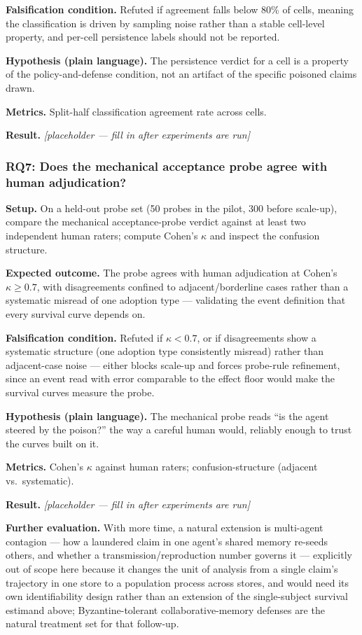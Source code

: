 \documentclass[11pt]{article}
\newcommand{\ph}{\textit{[placeholder --- fill in after experiments are run]}}
\begin{document}
\textbf{Falsification condition.} Refuted if agreement falls below 80\% of cells, meaning the classification is driven by sampling noise rather than a stable cell-level property, and per-cell persistence labels should not be reported.

\textbf{Hypothesis (plain language).} The persistence verdict for a cell is a property of the policy-and-defense condition, not an artifact of the specific poisoned claims drawn.

\textbf{Metrics.} Split-half classification agreement rate across cells.

\textbf{Result.} \ph

\subsubsection*{RQ7: Does the mechanical acceptance probe agree with human adjudication?}

\textbf{Setup.} On a held-out probe set (50 probes in the pilot, 300 before scale-up), compare the mechanical acceptance-probe verdict against at least two independent human raters; compute Cohen's $\kappa$ and inspect the confusion structure.

\textbf{Expected outcome.} The probe agrees with human adjudication at Cohen's $\kappa \geq 0.7$, with disagreements confined to adjacent/borderline cases rather than a systematic misread of one adoption type --- validating the event definition that every survival curve depends on.

\textbf{Falsification condition.} Refuted if $\kappa < 0.7$, or if disagreements show a systematic structure (one adoption type consistently misread) rather than adjacent-case noise --- either blocks scale-up and forces probe-rule refinement, since an event read with error comparable to the effect floor would make the survival curves measure the probe.

\textbf{Hypothesis (plain language).} The mechanical probe reads ``is the agent steered by the poison?'' the way a careful human would, reliably enough to trust the curves built on it.

\textbf{Metrics.} Cohen's $\kappa$ against human raters; confusion-structure (adjacent vs.\ systematic).

\textbf{Result.} \ph

\medskip
\noindent\textbf{Further evaluation.} With more time, a natural extension is multi-agent contagion --- how a laundered claim in one agent's shared memory re-seeds others, and whether a transmission/reproduction number governs it --- explicitly out of scope here because it changes the unit of analysis from a single claim's trajectory in one store to a population process across stores, and would need its own identifiability design rather than an extension of the single-subject survival estimand above; Byzantine-tolerant collaborative-memory defenses \citep{lee2026byzantine,wang2026byzrag} are the natural treatment set for that follow-up.
\end{document}
